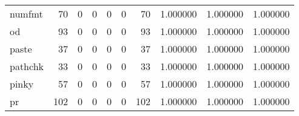 \begin{tabular}{lrrrrrrrrr}
numfmt    &                                        70 &                                                  0 &                                                  0 &                                                  0 &                                                  0 &                                                 70 &                                           1.000000 &                               1.000000 &                             1.000000 \\
od        &                                        93 &                                                  0 &                                                  0 &                                                  0 &                                                  0 &                                                 93 &                                           1.000000 &                               1.000000 &                             1.000000 \\
paste     &                                        37 &                                                  0 &                                                  0 &                                                  0 &                                                  0 &                                                 37 &                                           1.000000 &                               1.000000 &                             1.000000 \\
pathchk   &                                        33 &                                                  0 &                                                  0 &                                                  0 &                                                  0 &                                                 33 &                                           1.000000 &                               1.000000 &                             1.000000 \\
pinky     &                                        57 &                                                  0 &                                                  0 &                                                  0 &                                                  0 &                                                 57 &                                           1.000000 &                               1.000000 &                             1.000000 \\
pr        &                                       102 &                                                  0 &                                                  0 &                                                  0 &                                                  0 &                                                102 &                                           1.000000 &                               1.000000 &                             1.000000 \\

\end{tabular}
